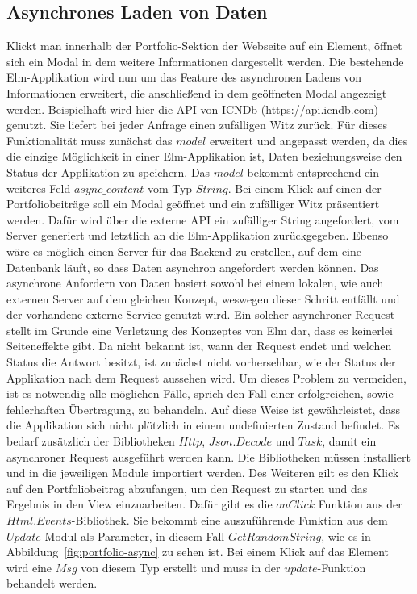 \subsection{Asynchrones Laden von Daten}
\label{sec:async-laden}
Klickt man innerhalb der Portfolio-Sektion der Webseite auf ein Element, öffnet sich ein Modal in dem weitere Informationen dargestellt werden. Die bestehende Elm-Applikation wird nun um das Feature des asynchronen Ladens von Informationen erweitert, die anschließend in dem geöffneten Modal angezeigt werden. Beispielhaft wird hier die \ac{API} von \ac{ICNDb} (\url{https://api.icndb.com}) genutzt. Sie liefert bei jeder Anfrage einen zufälligen Witz zurück.
Für dieses Funktionalität muss zunächst das $model$ erweitert und angepasst werden, da dies die einzige Möglichkeit in einer Elm-Applikation ist, Daten beziehungsweise den Status der Applikation zu speichern. Das $model$ bekommt entsprechend ein weiteres Feld $async\_content$ vom Typ $String$.
Bei einem Klick auf einen der Portfoliobeiträge soll ein Modal geöffnet und ein zufälliger Witz präsentiert werden. Dafür wird über die externe \ac{API} ein zufälliger String angefordert, vom Server generiert und letztlich an die Elm-Applikation zurückgegeben. Ebenso wäre es möglich einen Server für das Backend zu erstellen, auf dem eine Datenbank läuft, so dass Daten asynchron angefordert werden können. Das asynchrone Anfordern von Daten basiert sowohl bei einem lokalen, wie auch externen Server auf dem gleichen Konzept, weswegen dieser Schritt entfällt und der vorhandene externe Service genutzt wird.
Ein solcher asynchroner Request stellt im Grunde eine Verletzung des Konzeptes von Elm dar, dass es keinerlei Seiteneffekte gibt. Da nicht bekannt ist, wann der Request endet und welchen Status die Antwort besitzt, ist zunächst nicht vorhersehbar, wie der Status der Applikation nach dem Request aussehen wird. Um dieses Problem zu vermeiden, ist es notwendig alle möglichen Fälle, sprich den Fall einer erfolgreichen, sowie fehlerhaften Übertragung, zu behandeln. Auf diese Weise ist gewährleistet, dass die Applikation sich nicht plötzlich in einem undefinierten Zustand befindet. Es bedarf zusätzlich der Bibliotheken $Http$, $Json.Decode$ und $Task$, damit ein asynchroner Request ausgeführt werden kann. Die Bibliotheken müssen installiert und in die jeweiligen Module importiert werden. Des Weiteren gilt es den Klick auf den Portfoliobeitrag abzufangen, um den Request zu starten und das Ergebnis in den View einzuarbeiten. Dafür gibt es die $onClick$ Funktion aus der $Html.Events$-Bibliothek. Sie bekommt eine auszuführende Funktion aus dem $Update$-Modul als Parameter, in diesem Fall $GetRandomString$, wie es in Abbildung~\ref{fig:portfolio-async} zu sehen ist. Bei einem Klick auf das Element wird eine $Msg$ von diesem Typ erstellt und muss in der $update$-Funktion behandelt werden.
